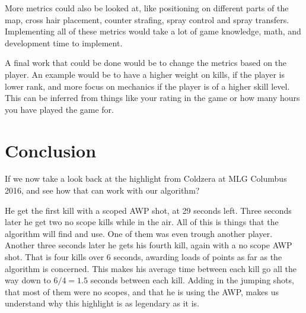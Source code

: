 More metrics could also be looked at, like positioning on different parts of the map, cross hair placement, counter strafing, spray control and spray transfers. Implementing all of these metrics would take a lot of game knowledge, math, and development time to implement.

A final work that could be done would be to change the metrics based on the player. An example would be to have a higher weight on kills, if the player is lower rank, and more focus on mechanics if the player is of a higher skill level. This can be inferred from things like your rating in the game or how many hours you have played the game for.
\section{Conclusion}
If we now take a look back at the highlight from Coldzera at MLG Columbus 2016, and see how that can work with our algorithm? 

He get the first kill with a scoped AWP shot, at 29 seconds left. Three seconds later he get two no scope kills while in the air. All of this is things that the algorithm will find and use. One of them was even trough another player. Another three seconds later he gets his fourth kill, again with a no scope AWP shot. That is four kills over 6 seconds, awarding loads of points as far as the algorithm is concerned. This makes his average time between each kill go all the way down to $6/4=1.5$ seconds between each kill. Adding in the jumping shots, that most of them were no scopes, and that he is using the AWP, makes us understand why this highlight is as legendary as it is.